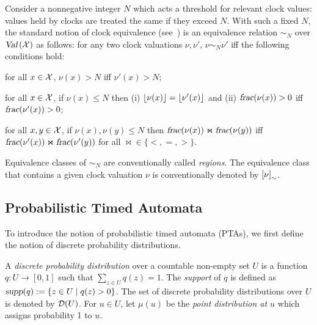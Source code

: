  Consider a nonnegative integer $N$ which acts a threshold for relevant clock values: values held by clocks are treated the same if they exceed $N$.
With such a fixed $N$, the standard notion of clock equivalence (see~\cite{DBLP:journals/tcs/AlurD94}) is an equivalence relation $\sim_N$ over $\mbox{\sl Val}\left(\mathcal{X}\right)$ as follows: for any two clock valuations $\nu,\nu'$, $\nu\sim_N\nu'$ iff the following conditions hold:
\begin{compactitem}
\item for all $x\in\mathcal{X}$, $\nu(x)>N$ iff $\nu'(x)> N$;
\item for all $x\in\mathcal{X}$, if $\nu(x)\le N$ then (i) ${\lfloor}{\nu(x)}{\rfloor}={\lfloor}{\nu'(x)}{\rfloor}$ and (ii) $\mbox{\sl frac}(\nu(x))>0$ iff $\mbox{\sl frac}(\nu'(x))>0$;
\item for all $x,y\in\mathcal{X}$, if $\nu(x),\nu(y)\le N$ then $\mbox{\sl frac}(\nu(x))\Join \mbox{\sl frac}(\nu(y))$ iff $\mbox{\sl frac}(\nu'(x))\Join \mbox{\sl frac}(\nu'(y))$ for all $\Join\in\{<,=,>\}$.
\end{compactitem}
Equivalence classes of $\sim_N$ are conventionally called \emph{regions}. The equivalence class that contains a given clock valuation $\nu$ is conventionally denoted by $\left[\nu\right]_\sim$.
\vspace{-0.8em}
\subsection{Probabilistic Timed Automata}
\vspace{-0.8em}
To introduce the notion of probabilistic timed automata (PTAs), we first define the notion of discrete probability distributions.

 A \emph{discrete probability distribution} over a countable non-empty set $U$ is a function $q:U\rightarrow[0,1]$ such that $\sum_{z\in U}q(z)=1$.
The \emph{support} of $q$ is defined as ${\mbox{\sl supp}}(q):=\{z\in U\mid q(z)>0\}$.
The set of discrete probability distributions over $U$ is denoted by ${\mathcal{D}}{\left(U\right)}$.
For $u \in U$, let $\mu(u)$ be the \emph{point distribution at $u$} which assigns probability 1 to $u$.

